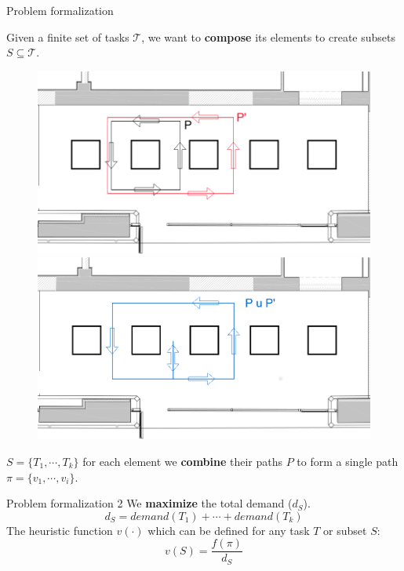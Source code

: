     \begin{frame}[fragile]{Problem formalization}
        
        Given a finite set of tasks $\mathcal{T}$, we want to {\bf compose} its elements to 
        create subsets $S\subseteq\mathcal{T}$.

        \begin{figure}
            
            \includegraphics[scale=0.18]{img/p1p2_cut.png}
            \includegraphics[scale=0.18]{img/p3_cut.png}
            
        \end{figure}
        $S = \{T_1,\cdots,T_k\}$ for each element we {\bf combine} their paths $P$ to form
        a single path $\pi = \{v_1,\cdots,v_i\}$.
    \end{frame}

    \begin{frame}[fragile]{Problem formalization 2}
       We {\bf maximize} the total demand ($d_S$).
        \[d_S =demand(T_1) + \cdots + demand(T_k)\]
        The heuristic function $v(\cdot)$ which
        can be defined for any task $T$ or subset $S$:
        \[ v(S) = \frac{f(\pi)}{d_S}\]
    \end{frame}

